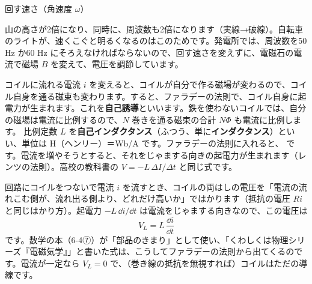 \begin{phbaisuru}{回す速さ（角速度 $\omega$）}
\noindent\begin{minipage}[c]{0.53\linewidth}\raggedright
山の高さが2倍になり、同時に、周波数も2倍になります（実線→破線）。自転車のライトが、速くこぐと明るくなるのはこのためです。発電所では、周波数を50 Hz か60 Hz にそろえなければならないので、回す速さを変えずに、電磁石の電流で磁場 $B$ を変えて、電圧を調節しています。\par\vspace{2pt}{\footnotesize （例題3 の発電機。実線は 50 Hz で山 157 V、破線は2倍の速さで回したとき）}
\end{minipage}\hfill
\begin{minipage}[c]{0.45\linewidth}\centering
{}
\end{minipage}
\end{phbaisuru}

\label{ph:電-8:sec6}
コイルに流れる電流 $i$ を変えると、コイルが自分で作る磁場が変わるので、コイル自身を通る磁束も変わります。すると、ファラデーの法則で、コイル自身に起電力が生まれます。これを\textbf{自己誘導}といいます。鉄を使わないコイルでは、自分の磁場は電流に比例するので、$N$ 巻きを通る磁束の合計 $N\Phi$ も電流に比例します。
比例定数 $L$ を\textbf{自己インダクタンス}（ふつう、単に\textbf{インダクタンス}）といい、単位は H（ヘンリー）＝Wb/A です。ファラデーの法則に入れると、
\label{ph:電-8:L}です。電流を増やそうとすると、それをじゃまする向きの起電力が生まれます（レンツの法則）。高校の教科書の $V=-L\,\Delta I/\Delta t$ と同じ式です。

回路にコイルをつないで電流 $i$ を流すとき、コイルの両はしの電圧を「電流の流れこむ側が、流れ出る側より、どれだけ高いか」ではかります（抵抗の電圧 $Ri$ と同じはかり方）。起電力 $-L\,\dd i/\dd t$ は電流をじゃまする向きなので、この電圧は
\[ V_L=L\,\frac{\dd i}{\dd t} \]
です。数学の本（6-4⑦）が「部品のきまり」として使い、「くわしくは物理シリーズ『電磁気学』」と書いた式は、こうしてファラデーの法則から出てくるのです。電流が一定なら $V_L=0$ で、（巻き線の抵抗を無視すれば）コイルはただの導線です。

